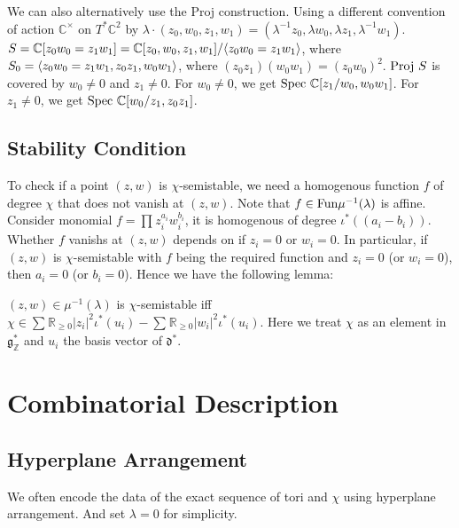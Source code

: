 \documentclass[b5paper]{article}
\newcommand{\Proj}{\textnormal{Proj }}
\newcommand{\Spec}{\textnormal{Spec }}
\begin{document}
\begin{example}[exp:]{}
  We can also alternatively use the Proj construction. Using a different convention of action $\mathbb{C}^\times $ on $T^*\mathbb{C}^2$ by $\lambda\cdot (z_0,w_0,z_1,w_1)=(\lambda^{-1}z_0,\lambda w_0,\lambda z_1,\lambda^{-1}w_1)$. $S=\mathbb{C}[z_0w_0=z_1w_1]=\mathbb{C}[z_0,w_0,z_1,w_1]/\langle z_0w_0=z_1w_1\rangle$, where $S_0=\langle z_0w_0=z_1w_1, z_0z_1,w_0w_1\rangle$, where $(z_0z_1)(w_0w_1)=(z_0w_0)^2$. $\Proj S$ is covered by $w_0\neq 0$ and $z_1\neq 0$. For $w_0\neq 0$, we get $\Spec \mathbb{C}[z_1/w_0,w_0w_1]$. For $z_1\neq 0$, we get $\Spec\mathbb{C}[w_0/z_1,z_0z_1]$.
\end{example}

\subsection{Stability Condition}

To check if a point $(z,w)$ is $\chi$-semistable, we need a homogenous function $f$ of degree $\chi$ that does not vanish at $(z,w)$. Note that $f\in \textnormal{Fun}\mu^{-1}(\lambda)$ is affine. Consider monomial $f=\prod_{}^{}z_i^{a_i}w_i^{b_i}$, it is homogenous of degree $\iota^*((a_i-b_i))$. Whether $f$ vanishs at $(z,w)$ depends on if $z_i=0$ or $w_i=0$. In particular, if $(z,w)$ is $\chi$-semistable with $f$ being the required function and $z_i=0$ (or $w_i=0$), then $a_i=0$ (or $b_i=0$). Hence we have the following lemma:

\begin{lemma}{}
  $(z,w)\in \mu^{-1}(\lambda)$ is $\chi$-semistable iff $\chi\in \sum_{}^{}\mathbb{R}_{\geq 0}|z_i|^2\iota^{*}(u_i)-\sum_{}^{}\mathbb{R}_{\geq 0}|w_i|^2\iota^{*}(u_i)$. Here we treat $\chi$ as an element in $\mathfrak{g}^*_{\mathbb{Z}}$ and $u_i$ the basis vector of $\mathfrak{d}^*$.
\end{lemma}

\section{Combinatorial Description}

\subsection{Hyperplane Arrangement}

We often encode the data of the exact sequence of tori and $\chi$ using hyperplane arrangement. And set $\lambda=0$ for simplicity.
\end{document}
